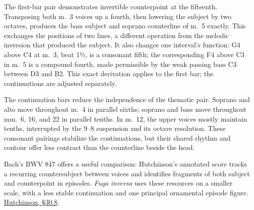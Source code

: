 \documentclass[11pt,a4paper]{article}
\begin{document}
The first-bar pair demonstrates invertible counterpoint at the fifteenth. Transposing both m.~3 voices up a fourth, then lowering the subject by two octaves, produces the bass subject and soprano counterline of m.~5 exactly. This exchanges the positions of two lines, a different operation from the melodic inversion that produced the subject. It also changes one interval's function: G4 above C4 at m.~3, beat 1½, is a consonant fifth; the corresponding F4 above C3 in m.~5 is a compound fourth, made permissible by the weak passing bass C3 between D3 and B2. This exact derivation applies to the first bar; the continuations are adjusted separately.

The continuation bars reduce the independence of the thematic pair. Soprano and alto move throughout m.~4 in parallel sixths; soprano and bass move throughout mm.~6, 16, and 22 in parallel tenths. In m.~12, the upper voices mostly maintain tenths, interrupted by the 9--8 suspension and its octave resolution. These consonant pairings stabilize the continuations, but their shared rhythm and contour offer less contrast than the counterline beside the head.

Bach's BWV 847 offers a useful comparison: Hutchinson's annotated score tracks a recurring countersubject between voices and identifies fragments of both subject and counterpoint in episodes. \emph{Fuga inversa} uses these resources on a smaller scale, with a less stable continuation and one principal ornamental episode figure. \href{https://musictheory.pugetsound.edu/mt21c/FugueAnalysis.html}{Hutchinson, §30.8}.
\end{document}
